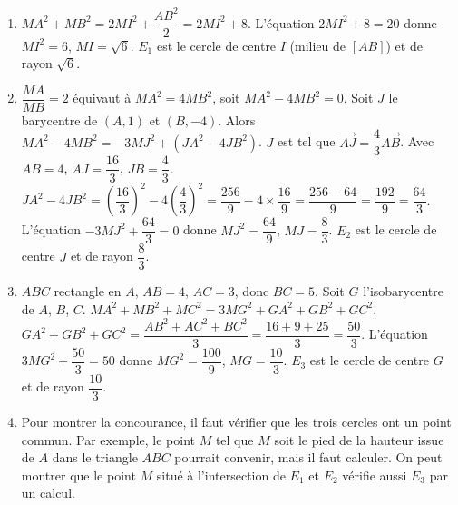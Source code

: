 \begin{enumerate}[label=\arabic*)]
\item $MA^2 + MB^2 = 2MI^2 + \dfrac{AB^2}{2} = 2MI^2 + 8$. L'équation $2MI^2 + 8 = 20$ donne $MI^2 = 6$, $MI = \sqrt{6}$. $E_1$ est le cercle de centre $I$ (milieu de $[AB]$) et de rayon $\sqrt{6}$.
\item $\dfrac{MA}{MB} = 2$ équivaut à $MA^2 = 4MB^2$, soit $MA^2 - 4MB^2 = 0$. Soit $J$ le barycentre de $(A,1)$ et $(B,-4)$. Alors $MA^2 - 4MB^2 = -3MJ^2 + (JA^2 - 4JB^2)$. $J$ est tel que $\overrightarrow{AJ} = \dfrac{4}{3}\overrightarrow{AB}$. Avec $AB=4$, $AJ = \dfrac{16}{3}$, $JB = \dfrac{4}{3}$. $JA^2 - 4JB^2 = \left(\dfrac{16}{3}\right)^2 - 4\left(\dfrac{4}{3}\right)^2 = \dfrac{256}{9} - 4\times\dfrac{16}{9} = \dfrac{256 - 64}{9} = \dfrac{192}{9} = \dfrac{64}{3}$. L'équation $-3MJ^2 + \dfrac{64}{3} = 0$ donne $MJ^2 = \dfrac{64}{9}$, $MJ = \dfrac{8}{3}$. $E_2$ est le cercle de centre $J$ et de rayon $\dfrac{8}{3}$.
\item $ABC$ rectangle en $A$, $AB=4$, $AC=3$, donc $BC=5$. Soit $G$ l'isobarycentre de $A$, $B$, $C$. $MA^2 + MB^2 + MC^2 = 3MG^2 + GA^2 + GB^2 + GC^2$. $GA^2 + GB^2 + GC^2 = \dfrac{AB^2 + AC^2 + BC^2}{3} = \dfrac{16 + 9 + 25}{3} = \dfrac{50}{3}$. L'équation $3MG^2 + \dfrac{50}{3} = 50$ donne $MG^2 = \dfrac{100}{9}$, $MG = \dfrac{10}{3}$. $E_3$ est le cercle de centre $G$ et de rayon $\dfrac{10}{3}$.
\item Pour montrer la concourance, il faut vérifier que les trois cercles ont un point commun. Par exemple, le point $M$ tel que $M$ soit le pied de la hauteur issue de $A$ dans le triangle $ABC$ pourrait convenir, mais il faut calculer. On peut montrer que le point $M$ situé à l'intersection de $E_1$ et $E_2$ vérifie aussi $E_3$ par un calcul.
\end{enumerate}

